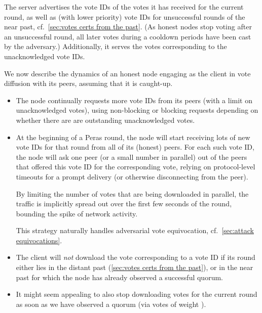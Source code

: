 The server advertises the vote IDs of the votes it has received for the current round, as well as (with lower priority) vote IDs for unsuccessful rounds of the near past, cf.~\cref{sec:votes certs from the past}.
(As honest nodes stop voting after an unsuccessful round, all later votes during a cooldown periods have been cast by the adversary.)
Additionally, it serves the votes corresponding to the unacknowledged vote IDs.

We now describe the dynamics of an honest node engaging as the client in vote diffusion with its peers, assuming that it is caught-up.
\begin{itemize}
\item
  The node continually requests more vote IDs from its peers (with a limit on unacknowledged votes), using non-blocking or blocking requests depending on whether there are are outstanding unacknowledged votes.
\item
  At the beginning of a Peras round, the node will start receiving lots of new vote IDs for that round from all of its (honest) peers.
  For each such vote ID, the node will ask one peer (or a small number in parallel) out of the peers that offered this vote ID for the corresponding vote, relying on protocol-level timeouts for a prompt delivery (or otherwise disconnecting from the peer).

  By limiting the number of votes that are being downloaded in parallel, the traffic is implicitly spread out over the first few seconds of the round, bounding the spike of network activity.

  This strategy naturally handles adversarial vote equivocation, cf.~\cref{sec:attack equivocations}.
\item
  The client will \emph{not} download the vote corresponding to a vote ID if its round either lies in the distant past (\cref{sec:votes certs from the past}), or in the near past for which the node has already observed a successful quorum.
\item
  It might seem appealing to also stop downloading votes for the current round as soon as we have observed a quorum (via votes of weight \perasQuorum{}).


\end{itemize}

